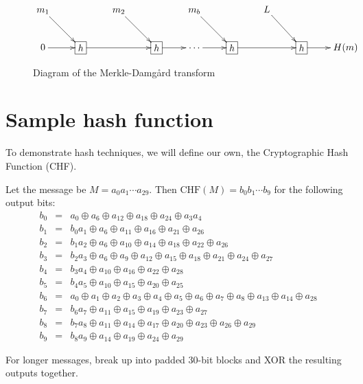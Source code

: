 \documentclass{book}
\theoremstyle{plain}
\theoremstyle{definition}
\begin{document}
\begin{figure}[h]
\begin{center}
$$\xymatrix{
m_1 \ar[dr] & & m_2 \ar[dr] & & m_b \ar[dr] & & L \ar[dr] \\
0 \ar[r] & *+[F]{h} \ar[rr] & & *+[F]{h} \ar[r] & \cdots \ar[r] & *+[F]{h} \ar[rr] & & *+[F]{h} \ar[r] & H(m)
}$$
\caption{Diagram of the Merkle-Damg\r{a}rd transform}
\label{fig:merkle-damgard}
\end{center}
\end{figure}

\section{Sample hash function}
To demonstrate hash techniques, we will define our own, the Cryptographic Hash Function (CHF).

Let the message be $M = a_0a_1 \cdots a_{29}$. Then $\text{CHF}(M) = b_0b_1 \cdots b_9$ for the following output bits:
\begin{eqnarray*}
b_0 &=& a_0 \oplus a_6 \oplus a_{12} \oplus a_{18} \oplus a_{24} \oplus a_3a_4 \\
b_1 &=& b_0a_1 \oplus a_6 \oplus a_{11} \oplus a_{16} \oplus a_{21} \oplus a_{26} \\
b_2 &=& b_1a_2 \oplus a_6 \oplus a_{10} \oplus a_{14} \oplus a_{18} \oplus a_{22} \oplus a_{26} \\
b_3 &=& b_2a_3 \oplus a_6 \oplus a_9 \oplus a_{12} \oplus a_{15} \oplus a_{18} \oplus a_{21} \oplus a_{24} \oplus a_{27} \\
b_4 &=& b_3a_4 \oplus a_{10} \oplus a_{16} \oplus a_{22} \oplus a_{28} \\
b_5 &=& b_4a_5 \oplus a_{10} \oplus a_{15} \oplus a_{20} \oplus a_{25} \\
b_6 &=& a_0 \oplus a_1 \oplus a_2 \oplus a_3 \oplus a_4 \oplus a_5 \oplus a_6 \oplus a_7 \oplus a_8 \oplus a_{13} \oplus a_{14} \oplus a_{28} \\
b_7 &=& b_6a_7 \oplus a_{11} \oplus a_{15} \oplus a_{19} \oplus a_{23} \oplus a_{27} \\
b_8 &=& b_7a_8 \oplus a_{11} \oplus a_{14} \oplus a_{17} \oplus a_{20} \oplus a_{23} \oplus a_{26} \oplus a_{29} \\
b_9 &=& b_8a_9 \oplus a_{14} \oplus a_{19} \oplus a_{24} \oplus a_{29}
\end{eqnarray*}

For longer messages, break up into padded 30-bit blocks and XOR the resulting outputs together.
\end{document}
